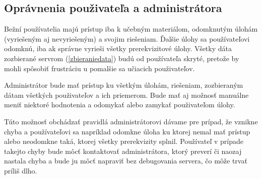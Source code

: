 \subsection{Oprávnenia použivateľa a administrátora}
Bežní používatelia majú prístup iba k učebným materiálom, odomknutým úlohám (vyriešeným aj nevyriešeným) a svojim riešeniam. Ďalšie úlohy sa používateľovi odomknú, iba ak správne vyrieši všetky prerekvizitové úlohy. Všetky dáta zozbierané servrom (\ref{zbieraniedata}) budú od používateľa skryté, pretože by mohli spôsobiť frustráciu u pomalšie sa učiacich použivateľov.

Administrátor bude mať prístup ku všetkým úlohám, riešeniam, zozbieraným dátam všetkých použivateľov a ich priemerom. Bude mať aj možnosť manuálne meniť niektoré hodnotenia a odomykať alebo zamykať použivateľom úlohy.

Túto možnosť obchádzať pravidlá administrátorovi dávame pre prípad, že vznikne chyba a používateľovi sa napríklad odomkne úloha ku ktorej nemal mať prístup alebo neodomkne taká, ktorej všetky prerekvizity splnil. Používateľ v prípade takejto chyby bude môcť kontaktovať administrátora, ktorý preverí či naozaj nastala chyba a bude ju môcť napraviť bez debugovania servera, čo môže trvať príliš dlho.
